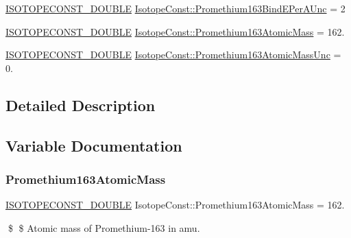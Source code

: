 \begin{DoxyCompactItemize}
\mbox{\hyperlink{group___isotope_const-_macros_ga8f45a7272ce02c0b4c65c44636ed719a}{I\+S\+O\+T\+O\+P\+E\+C\+O\+N\+S\+T\+\_\+\+D\+O\+U\+B\+LE}} \mbox{\hyperlink{group___isotope_const-_promethium-_pm163_ga717e484ceec2f3f5053c0806f2e82eca}{Isotope\+Const\+::\+Promethium163\+Bind\+E\+Per\+A\+Unc}} = 2
\item 
\mbox{\hyperlink{group___isotope_const-_macros_ga8f45a7272ce02c0b4c65c44636ed719a}{I\+S\+O\+T\+O\+P\+E\+C\+O\+N\+S\+T\+\_\+\+D\+O\+U\+B\+LE}} \mbox{\hyperlink{group___isotope_const-_promethium-_pm163_ga1c74af82965e58e4764e12515883b4bd}{Isotope\+Const\+::\+Promethium163\+Atomic\+Mass}} = 162.
\item 
\mbox{\hyperlink{group___isotope_const-_macros_ga8f45a7272ce02c0b4c65c44636ed719a}{I\+S\+O\+T\+O\+P\+E\+C\+O\+N\+S\+T\+\_\+\+D\+O\+U\+B\+LE}} \mbox{\hyperlink{group___isotope_const-_promethium-_pm163_gadb4fcd16cfcc9ad1b04f7b18a940f023}{Isotope\+Const\+::\+Promethium163\+Atomic\+Mass\+Unc}} = 0.
\end{DoxyCompactItemize}


\subsection{Detailed Description}


\subsection{Variable Documentation}
\mbox{\label{group___isotope_const-_promethium-_pm163_ga1c74af82965e58e4764e12515883b4bd}} 
\subsubsection{\texorpdfstring{Promethium163\+Atomic\+Mass}{Promethium163AtomicMass}}
{\footnotesize\ttfamily \mbox{\hyperlink{group___isotope_const-_macros_ga8f45a7272ce02c0b4c65c44636ed719a}{I\+S\+O\+T\+O\+P\+E\+C\+O\+N\+S\+T\+\_\+\+D\+O\+U\+B\+LE}} Isotope\+Const\+::\+Promethium163\+Atomic\+Mass = 162.}

\$ \$ Atomic mass of Promethium-\/163 in amu. \mbox{\label{group___isotope_const-_promethium-_pm163_gadb4fcd16cfcc9ad1b04f7b18a940f023}} 
